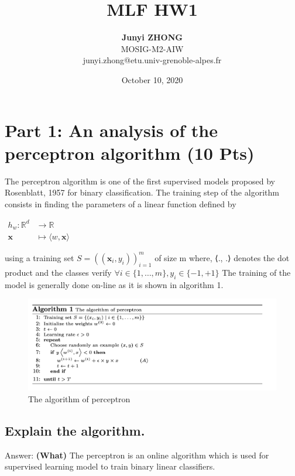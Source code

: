 \documentclass{article}
\title{MLF HW1}
\author{\textbf{Junyi ZHONG} \\ MOSIG-M2-AIW\\  junyi.zhong@etu.univ-grenoble-alpes.fr}
\date{October 10, 2020}
\begin{document}
\maketitle

\section{Part 1: An analysis of the perceptron algorithm (10 Pts)}
The perceptron algorithm is one of the first supervised models proposed by Rosenblatt, 1957 for binary classification. The training step of the algorithm consists in finding the parameters of a linear function defined by


$\begin{aligned} h_{w}: \mathbb{R}^{d} & \rightarrow \mathbb{R} \\ \mathbf{x} & \mapsto\langle w, \mathbf{x}\rangle \end{aligned}$

using a training set $S=\left(\left(\mathbf{x}_{i}, y_{i}\right)\right)_{i=1}^{m}$ of size m where, ⟨., .⟩ denotes the dot product and the classes verify $\forall i \in\{1, \ldots, m\}, y_{i} \in\{-1,+1\}$ The training of the model is generally done on-line as it is shown in algorithm 1.

\begin{figure}[h!]
    \centering
    \includegraphics[scale=0.13]{perceptron.png}
    \caption{The algorithm of perceptron}
    \label{fig:universe}
\end{figure}
 \subsection{\textbf{Explain the algorithm.}}
Answer:
\newline
\newline
\textbf{(What)}  The perceptron is an online algorithm which is used for supervised learning model to train binary linear classifiers. 
\end{document}
